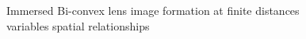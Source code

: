 \documentclass[main.tex]{subfiles}
\begin{document}






\begin{figure}
\centering{}
\caption{Immersed Bi-convex lens image formation at finite distances variables spatial relationships}
\label{fig:5}
\end{figure}
\end{document}
